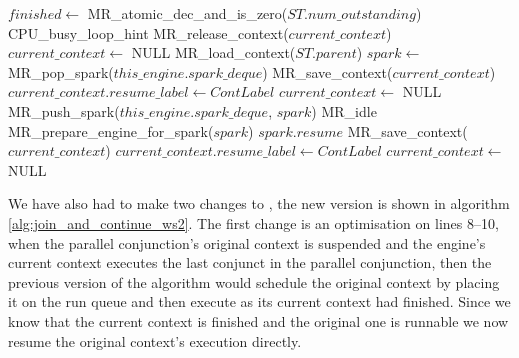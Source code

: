 \begin{algorithm}[tbp]
\begin{algorithmic}[1]
  \State $finished \gets$ MR\_atomic\_dec\_and\_is\_zero($ST.num\_outstanding$)
        \State CPU\_busy\_loop\_hint
      \EndWhile
      \State MR\_release\_context($current\_context$)
      \State $current\_context \gets$ NULL
      \State MR\_load\_context($ST.parent$)
    \EndIf
  \Else
    \State $spark \gets$ MR\_pop\_spark($this\_engine.spark\_deque$)
            \State MR\_save\_context($current\_context$)
            \State $current\_context.resume\_label \gets ContLabel$
            \State $current\_context \gets$ NULL
                \State MR\_push\_spark($this\_engine.spark\_deque$, $spark$)
                \Goto MR\_idle
            \EndIf
        \EndIf
        \State MR\_prepare\_engine\_for\_spark($spark$)
        \Goto $spark.resume$
    \Else
            \State MR\_save\_context($current\_context$)
            \State $current\_context.resume\_label \gets ContLabel$
            \State $current\_context \gets$ NULL
        \EndIf
    \EndIf
  \EndIf
\EndProcedure
\end{algorithmic}
\caption{\joinandcontinue}
\label{alg:join_and_continue_ws2}
\end{algorithm}

We have also had to make two changes to \joinandcontinue,
the new version is shown in algorithm \ref{alg:join_and_continue_ws2}.
The first change is an optimisation on lines 8--10,
when the parallel conjunction's original context is suspended
and the engine's current context executes the last conjunct in the parallel
conjunction,
then the previous version of the algorithm would schedule the original
context by placing it on the run queue and then execute \idle as its current
context had finished.
Since we know that the current context is finished and the original one is
runnable we now resume the original context's execution directly.

